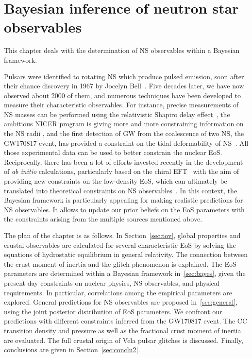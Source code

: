 %

\chapter{Bayesian inference of neutron star observables}

This chapter deals with the determination of NS observables within a Bayesian 
framework.

Pulsars were identified to rotating NS which produce pulsed emission, soon 
after their chance discovery in 1967 by Jocelyn Bell~\cite{Hewish1968}. Five
decades later, we have now observed about 2000 of them, and numerous techniques
have been developed to measure their characteristic observables. For instance, 
precise measurements of NS masses can be performed using the relativistic 
Shapiro delay effect~\cite{Demorest2010,Antoniadis2013,Cromartie2020}, the
ambitious NICER program {is giving more and more constraining information 
  on the NS radii
\cite{Bogdanov2019a,Bogdanov2019b,Miller2019,Raaijmakers2019,Riley2019}}, and 
the first detection of GW from the coalescence of two NS, the GW170817 event, 
has provided a
constraint on the tidal deformability of NS~\cite{GWtidal,GW1,GW2}. All those
experimental data can be used to better constrain the nuclear EoS. 
Reciprocally, there has been a lot of efforts invested recently in the 
development of \textit{ab initio} calculations, particularly based on the 
chiral EFT~\cite{Drischler2016} with the aim of providing new 
constraints on the low-density EoS, which can
ultimately be translated into theoretical constraints on NS
observables~\cite{Carreau2019cc,Carreau2019moi}.
In this context, the Bayesian framework is particularly appealing for making 
realistic predictions for NS observables. It allows to update our prior beliefs 
on the EoS parameters with the constraints arising from the multiple sources 
mentioned above.

The plan of the chapter is as follows. In Section~\ref{sec:tov}, global
properties and crustal observables are calculated for several characteristic 
EoS by solving the equations of hydrostatic equilibrium in general relativity.
The connection between the crust moment of inertia and the glitch phenomenon is
explained. The EoS parameters are determined within a 
Bayesian framework in~\ref{sec:bayes}, given the present day constraints on
nuclear physics, NS observables, and physical requirements. In particular,
correlations among the empirical parameters are explored. General predictions
for NS observables are proposed in~\ref{sec:general}, using the joint posterior
distribution of EoS parameters. We confront our predictions with different 
constraints inferred from the GW170817 event. The CC transition density and
pressure as well as the fractional crust moment of inertia are evaluated. The
full crustal origin of Vela pulsar glitches is discussed. Finally, conclusions 
are given in Section~\ref{sec:conclu2}.

